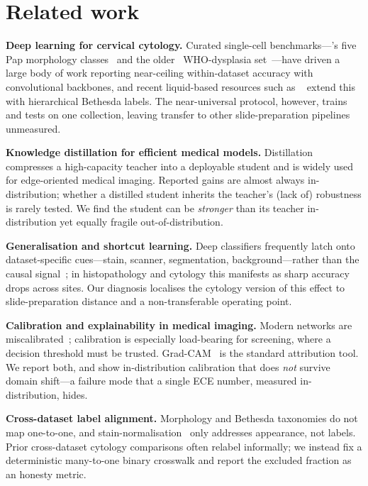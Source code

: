 \section{Related work}
\label{sec:related}

\noindent\textbf{Deep learning for cervical cytology.} Curated single-cell benchmarks---\sipakmed's
five Pap morphology classes~\cite{plissiti2018sipakmed} and the older \herlev\ WHO-dysplasia
set~\cite{jantzen2005herlev}---have driven a large body of work reporting near-ceiling within-dataset
accuracy with convolutional backbones, and recent liquid-based resources such as
\hicervix~\cite{cai2024hicervix} extend this with hierarchical Bethesda labels. The near-universal
protocol, however, trains and tests on one collection, leaving transfer to other slide-preparation
pipelines unmeasured.

\noindent\textbf{Knowledge distillation for efficient medical models.}
Distillation~\cite{hinton2015distilling} compresses a high-capacity teacher into a deployable student
and is widely used for edge-oriented medical imaging. Reported gains are almost always
in-distribution; whether a distilled student inherits the teacher's (lack of) robustness is rarely
tested. We find the student can be \emph{stronger} than its teacher in-distribution yet equally
fragile out-of-distribution.

\noindent\textbf{Generalisation and shortcut learning.} Deep classifiers frequently latch onto
dataset-specific cues---stain, scanner, segmentation, background---rather than the causal
signal~\cite{geirhos2020shortcut}; in histopathology and cytology this manifests as sharp accuracy
drops across sites. Our diagnosis localises the cytology version of this effect to slide-preparation
distance and a non-transferable operating point.

\noindent\textbf{Calibration and explainability in medical imaging.} Modern networks are
miscalibrated~\cite{guo2017calibration}; calibration is especially load-bearing for screening, where a
decision threshold must be trusted. Grad-CAM~\cite{selvaraju2017gradcam} is the standard
attribution tool. We report both, and show in-distribution calibration that does \emph{not} survive
domain shift---a failure mode that a single ECE number, measured in-distribution, hides.

\noindent\textbf{Cross-dataset label alignment.} Morphology and Bethesda taxonomies do not map
one-to-one, and stain-normalisation~\cite{macenko2009stain} only addresses appearance, not labels.
Prior cross-dataset cytology comparisons often relabel informally; we instead fix a deterministic
many-to-one binary crosswalk and report the excluded fraction as an honesty metric.
